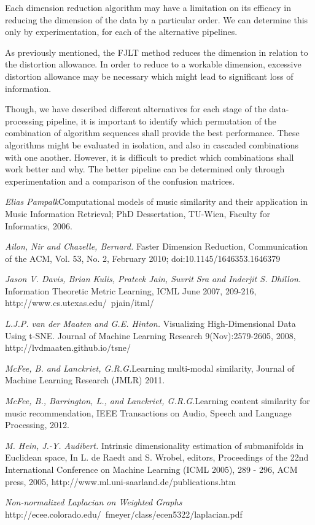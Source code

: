 \documentclass[10pt]{article}
\begin{document}
Each dimension reduction algorithm may have a limitation on its efficacy in reducing the dimension of the data by a particular order. We can determine this only by experimentation, for each of the alternative pipelines. 

As previously mentioned, the FJLT method reduces the dimension in relation to the distortion allowance.  In order to reduce to a workable dimension, excessive distortion allowance may be necessary which might lead to significant loss of information.

Though, we have described different alternatives for each stage of the data-processing pipeline, it is important to identify which permutation of the combination of algorithm sequences shall provide the best performance. These algorithms might be evaluated in isolation, and also in cascaded combinations with one another. However, it is difficult to predict which combinations shall work better and why. The better pipeline can be determined only through experimentation and a comparison of the confusion matrices. 


\begin{thebibliography}{5}
\textit{Elias Pampalk}Computational models of music similarity and their application in Music Information Retrieval; PhD Dessertation, TU-Wien, Faculty for Informatics, 2006.

\textit{Ailon, Nir and Chazelle, Bernard.} Faster Dimension Reduction, Communication of the ACM, Vol. 53, No. 2, February 2010;  doi:10.1145/1646353.1646379

\textit{Jason V. Davis, Brian Kulis, Prateek Jain, Suvrit Sra and Inderjit S. Dhillon.} Information Theoretic Metric Learning, ICML June 2007, 209-216,  http://www.cs.utexas.edu/~pjain/itml/

\textit{L.J.P. van der Maaten and G.E. Hinton.} Visualizing High-Dimensional Data Using t-SNE. Journal of Machine Learning Research 9(Nov):2579-2605, 2008, http://lvdmaaten.github.io/tsne/

\textit{McFee, B. and Lanckriet, G.R.G.}Learning multi-modal similarity, Journal of Machine Learning Research (JMLR) 2011.

 \textit{McFee, B., Barrington, L., and Lanckriet, G.R.G.}Learning content similarity for music recommendation, IEEE Transactions on Audio, Speech and Language Processing, 2012.

\textit{M. Hein, J.-Y. Audibert. }Intrinsic dimensionality estimation of submanifolds in Euclidean space,
In L. de Raedt and S. Wrobel, editors, Proceedings of the 22nd International Conference on Machine Learning (ICML 2005), 289 - 296, ACM press, 2005, http://www.ml.uni-saarland.de/publications.htm

\textit{Non-normalized Laplacian on Weighted Graphs} http://ecee.colorado.edu/~fmeyer/class/ecen5322/laplacian.pdf

\end{thebibliography}
\end{document}
